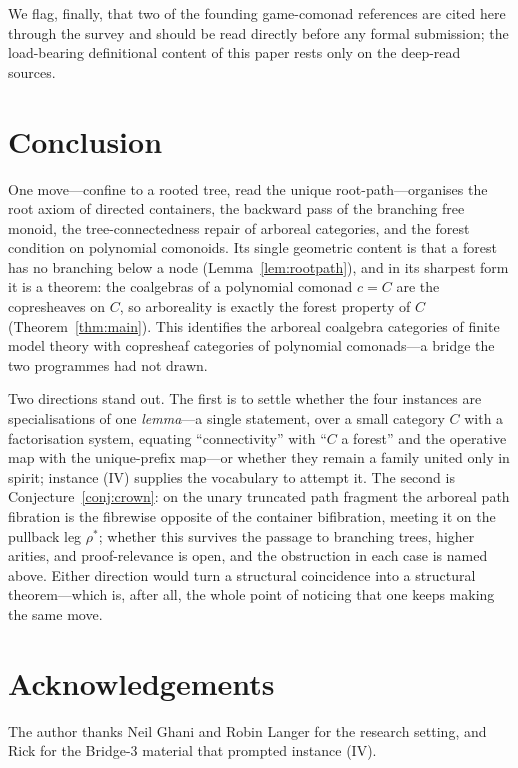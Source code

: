\documentclass[11pt,reqno]{amsart}
\theoremstyle{plain}
\theoremstyle{definition}
\begin{document}
We flag, finally, that two of the founding game-comonad references \cite{AbramskyShah2021,
AbramskyDawarWang2017} are cited here through the survey \cite{JaklReggio2026} and should be read directly
before any formal submission; the load-bearing definitional content of this paper rests only on the
deep-read sources.

\section{Conclusion}\label{sec:conclusion}

One move---confine to a rooted tree, read the unique root-path---organises the root axiom of directed
containers, the backward pass of the branching free monoid, the tree-connectedness repair of arboreal
categories, and the forest condition on polynomial comonoids. Its single geometric content is that a
forest has no branching below a node (Lemma~\ref{lem:rootpath}), and in its sharpest form it is a theorem:
the coalgebras of a polynomial comonad $c = C$ are the copresheaves on $C$, so arboreality is exactly the
forest property of $C$ (Theorem~\ref{thm:main}). This identifies the arboreal coalgebra categories of
finite model theory with copresheaf categories of polynomial comonads---a bridge the two programmes had
not drawn.

Two directions stand out. The first is to settle whether the four instances are specialisations of one
\emph{lemma}---a single statement, over a small category $C$ with a factorisation system, equating
``connectivity'' with ``$C$ a forest'' and the operative map with the unique-prefix map---or whether they
remain a family united only in spirit; instance (IV) supplies the vocabulary to attempt it. The second is
Conjecture~\ref{conj:crown}: on the unary truncated path fragment the arboreal path fibration is the
fibrewise opposite of the container bifibration, meeting it on the pullback leg $\rho^{*}$; whether this
survives the passage to branching trees, higher arities, and proof-relevance is open, and the
obstruction in each case is named above. Either direction would turn a structural coincidence into a
structural theorem---which is, after all, the whole point of noticing that one keeps making the same move.

\section*{Acknowledgements}
The author thanks Neil Ghani and Robin Langer for the research setting, and Rick for the Bridge-3
material that prompted instance (IV).
\end{document}
